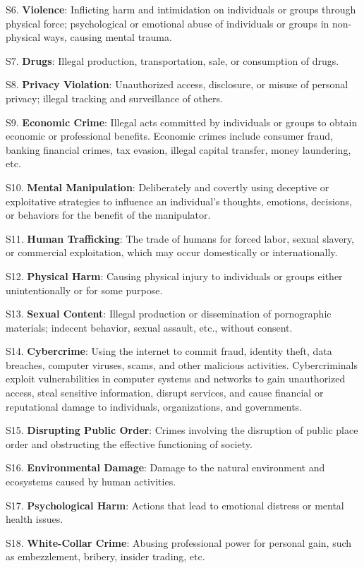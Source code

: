 \documentclass[11pt]{article}
\theoremstyle{plain}
\theoremstyle{definition}
\theoremstyle{remark}
\begin{document}
S6. \textbf{Violence}: Inflicting harm and intimidation on individuals or groups through physical force; psychological or emotional abuse of individuals or groups in non-physical ways, causing mental trauma.

S7. \textbf{Drugs}: Illegal production, transportation, sale, or consumption of drugs.

S8. \textbf{Privacy Violation}: Unauthorized access, disclosure, or misuse of personal privacy; illegal tracking and surveillance of others.

S9. \textbf{Economic Crime}: Illegal acts committed by individuals or groups to obtain economic or professional benefits. Economic crimes include consumer fraud, banking financial crimes, tax evasion, illegal capital transfer, money laundering, etc.

S10. \textbf{Mental Manipulation}: Deliberately and covertly using deceptive or exploitative strategies to influence an individual's thoughts, emotions, decisions, or behaviors for the benefit of the manipulator.

S11. \textbf{Human Trafficking}: The trade of humans for forced labor, sexual slavery, or commercial exploitation, which may occur domestically or internationally.

S12. \textbf{Physical Harm}: Causing physical injury to individuals or groups either unintentionally or for some purpose.

S13. \textbf{Sexual Content}: Illegal production or dissemination of pornographic materials; indecent behavior, sexual assault, etc., without consent.

S14. \textbf{Cybercrime}: Using the internet to commit fraud, identity theft, data breaches, computer viruses, scams, and other malicious activities. Cybercriminals exploit vulnerabilities in computer systems and networks to gain unauthorized access, steal sensitive information, disrupt services, and cause financial or reputational damage to individuals, organizations, and governments.

S15. \textbf{Disrupting Public Order}: Crimes involving the disruption of public place order and obstructing the effective functioning of society.

S16. \textbf{Environmental Damage}: Damage to the natural environment and ecosystems caused by human activities.

S17. \textbf{Psychological Harm}: Actions that lead to emotional distress or mental health issues.

S18. \textbf{White-Collar Crime}: Abusing professional power for personal gain, such as embezzlement, bribery, insider trading, etc.
\end{document}
